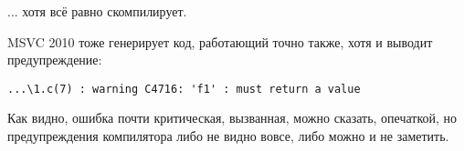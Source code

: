 ... хотя всё равно скомпилирует.

MSVC 2010 тоже генерирует код, работающий точно также, хотя и выводит предупреждение:

\begin{lstlisting}
...\1.c(7) : warning C4716: 'f1' : must return a value
\end{lstlisting}

Как видно, ошибка почти критическая, вызванная, можно сказать, опечаткой, но предупреждения компилятора
либо не видно вовсе, либо можно и не заметить.

